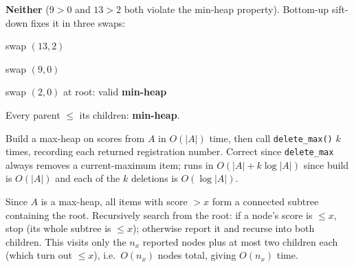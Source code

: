 \documentclass[12pt,twoside]{article}
\begin{document}
\begin{problems}
\begin{problemparts}
\problempart %
\begin{center}
\end{center}
\textbf{Neither} ($9 > 0$ and $13 > 2$ both violate the min-heap
property). Bottom-up sift-down fixes it in three swaps:
\begin{center}
\hfill swap $(13,2)$
\end{center}
\begin{center}
\hfill swap $(9,0)$
\end{center}
\begin{center}
\hfill swap $(2,0)$ at root: valid \textbf{min-heap}
\end{center}

\problempart %
\begin{center}
\end{center}
Every parent $\le$ its children: \textbf{min-heap}.

\end{problemparts}

\problem  %

\begin{problemparts}

\problempart %
Build a max-heap on scores from $A$ in $O(|A|)$ time, then call
\texttt{delete\_max()} $k$ times, recording each returned
registration number. Correct since \texttt{delete\_max} always
removes a current-maximum item; runs in $O(|A| + k\log|A|)$ since
build is $O(|A|)$ and each of the $k$ deletions is $O(\log|A|)$.

\problempart %
Since $A$ is a max-heap, all items with score $>x$ form a connected
subtree containing the root. Recursively search from the root: if a
node's score is $\le x$, stop (its whole subtree is $\le x$);
otherwise report it and recurse into both children. This visits only
the $n_x$ reported nodes plus at most two children each (which turn
out $\le x$), i.e.\ $O(n_x)$ nodes total, giving $O(n_x)$ time.


\end{problemparts}
\end{problems}
\end{document}
